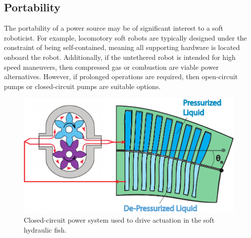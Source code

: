 \subsection{Portability}
The portability of a power source may be of significant interest to a soft roboticist.
For example, locomotory soft robots are typically designed under the constraint of being self-contained, meaning all supporting hardware is located onboard the robot.
Additionally, if the untethered robot is intended for high speed maneuvers, then compressed gas \citep{marchese2014autonomous} or combustion \citep{tolley2014untethered} are viable power alternatives.
However, if prolonged operations are required, then open-circuit pumps \citep{tolley2014resilient, onal2013autonomous} or closed-circuit pumps \citep{katzschmann2014hydraulic} are suitable options.
\begin{figure}[htb]
        \centering
            \includegraphics[width=0.85\columnwidth]{figures/power/fish_actuation_principle.pdf}
        \caption[Fish's soft tail actuation principle]{Closed-circuit power system used to drive actuation in the soft hydraulic fish.}
            \label{fig:tail_actuation_principle}
\end{figure}
